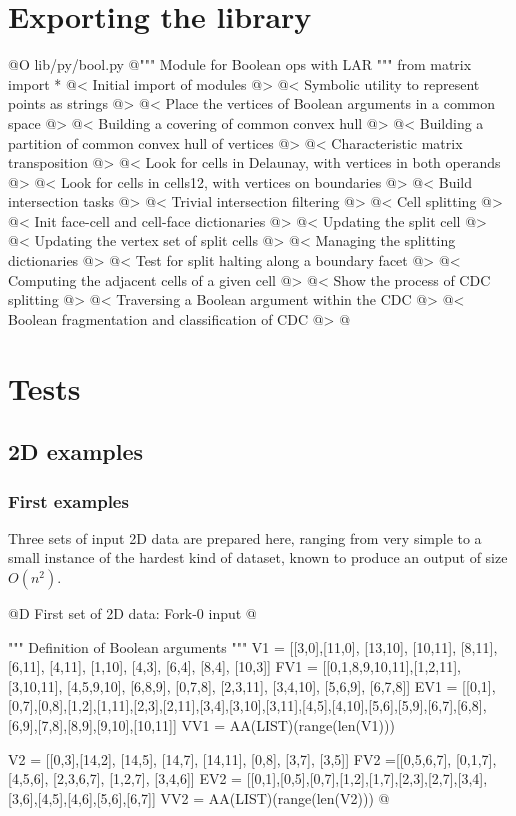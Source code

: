 \documentclass[11pt,oneside]{article}	%
\begin{document}
\section{Exporting the library}


@O lib/py/bool.py
@{""" Module for Boolean ops with LAR """
from matrix import *
@< Initial import of modules @>
@< Symbolic utility to represent points as strings @>
@< Place the vertices of Boolean arguments in a common space @>
@< Building a covering of common convex hull @>
@< Building a partition of common convex hull of vertices @>
@< Characteristic matrix transposition @>
@< Look for cells in Delaunay, with vertices in both operands @>
@< Look for cells in cells12, with vertices on boundaries @>
@< Build intersection tasks @>
@< Trivial intersection filtering @>
@< Cell splitting @>
@< Init face-cell and cell-face dictionaries @>
@< Updating the split cell @>
@< Updating the vertex set  of split cells @>
@< Managing the splitting dictionaries @>
@< Test for split halting along a boundary facet @>
@< Computing the adjacent cells of a given cell @>
@< Show the process of CDC splitting @>
@< Traversing a Boolean argument within the CDC @>
@< Boolean fragmentation and classification of CDC @>
@}

\section{Tests}



\subsection{2D examples}

\subsubsection{First examples}

Three sets of input 2D data are prepared here, ranging from very simple to a small instance of the hardest kind of dataset, known to produce an output of size $O(n^2)$.


@D First set of 2D data: Fork-0 input
@{""" Definition of Boolean arguments """
V1 = [[3,0],[11,0], [13,10], [10,11], [8,11], [6,11], [4,11], [1,10], [4,3], [6,4], 
	[8,4], [10,3]]
FV1 = [[0,1,8,9,10,11],[1,2,11], [3,10,11], [4,5,9,10], [6,8,9], [0,7,8], [2,3,11],
	[3,4,10], [5,6,9], [6,7,8]]
EV1 = [[0,1],[0,7],[0,8],[1,2],[1,11],[2,3],[2,11],[3,4],[3,10],[3,11],[4,5],[4,10],[5,6],[5,9],[6,7],[6,8],[6,9],[7,8],[8,9],[9,10],[10,11]]
VV1 = AA(LIST)(range(len(V1)))

V2 = [[0,3],[14,2], [14,5], [14,7], [14,11], [0,8], [3,7], [3,5]]
FV2 =[[0,5,6,7], [0,1,7], [4,5,6], [2,3,6,7], [1,2,7], [3,4,6]]
EV2 = [[0,1],[0,5],[0,7],[1,2],[1,7],[2,3],[2,7],[3,4],[3,6],[4,5],[4,6],[5,6],[6,7]]
VV2 = AA(LIST)(range(len(V2)))
@}
\end{document}
